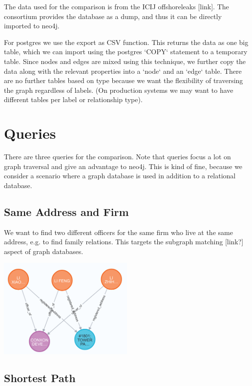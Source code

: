 \documentclass[11pt, a4paper,oneside,chapterprefix=false]{scrbook}
\begin{document}
The data used for the comparison is from the ICIJ offshoreleaks [link].
The consortium provides the database as a dump, and thus it can be directly imported to neo4j.

For postgres we use the export as CSV function.
This returns the data as one big table, which we can import using the postgres `COPY` statement to a temporary table.
Since nodes and edges are mixed using this technique, we further copy the data along with the relevant properties into a `node` and an `edge` table.
There are no further tables based on type because we want the flexibility of traversing the graph regardless of labels.
(On production systems we may want to have different tables per label or relationship type).

\section{Queries} \label{sec:benchmark}

There are three queries for the comparison. Note that queries focus a lot on graph traversal and give an advantage to neo4j. 
This is kind of fine, because we consider a scenario where a graph database is used in addition to a relational database.




\subsection{Same Address and Firm}

We want to find two different officers for the same firm who live at the same address, e.g. to find family relations.
This targets the subgraph matching [link?] aspect of graph databases.

\includegraphics*[width=0.5\textwidth]{figures/query_relation.png} \hfill

\subsection{Shortest Path}
\end{document}

